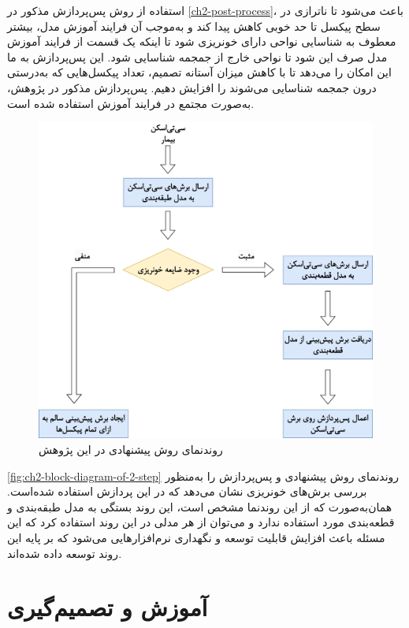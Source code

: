 استفاده از روش پس‌پردازش مذکور در 
\autoref{ch2-post-process}،
	باعث می‌شود تا ناترازی در سطح پیکسل تا حد خوبی کاهش پیدا کند و به‌موجب آن فرایند آموزش مدل، بیشتر معطوف به شناسایی نواحی دارای خونریزی شود تا اینکه یک قسمت از فرایند آموزش مدل صرف این شود تا نواحی خارج از جمجمه شناسایی شود. این پس‌پردازش به ما این امکان را می‌دهد تا با کاهش میزان آستانه تصمیم، تعداد پیکسل‌هایی که به‌درستی درون جمجمه شناسایی می‌شوند را افزایش دهیم. پس‌پردازش مذکور در پژوهش، به‌صورت مجتمع در فرایند آموزش استفاده شده است.
	\begin{figure}[h]
\centering
\includegraphics[height=0.5\textheight]{"Images/Chapter2/block diagram of 2 step .drawio"}
\caption{روندنمای روش پیشنهادی در این پژوهش}
\label{fig:ch2-block-diagram-of-2-step}
\end{figure}

\autoref{fig:ch2-block-diagram-of-2-step}
روندنمای روش پیشنهادی و پس‌پردازش را به‌منظور بررسی برش‌های خونریزی نشان می‌دهد که در این پردازش استفاده شده‌است. همان‌به‌صورت که از این روند‌نما مشخص است، این روند بستگی به مدل طبقه‌بندی و قطعه‌بندی مورد استفاده ندارد و می‌توان از هر مدلی در این روند استفاده کرد که این مسئله باعث افزایش قابلیت توسعه و نگهداری نرم‌افزارهایی می‌شود که بر پایه این روند توسعه داده‌ شده‌اند.

\section{آموزش و تصمیم‌گیری}

